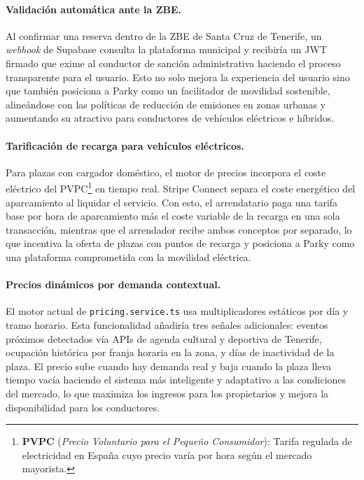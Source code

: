 \paragraph{Validación automática ante la ZBE.}
Al confirmar una reserva dentro de la ZBE de Santa Cruz de Tenerife, un \textit{webhook} de Supabase consulta la plataforma municipal y recibiría un JWT firmado que exime al conductor de sanción administrativa haciendo el proceso transparente para el usuario. Esto no solo mejora la experiencia del usuario sino que también posiciona a Parky como un facilitador de movilidad sostenible, alineándose con las políticas de reducción de emisiones en zonas urbanas y aumentando su atractivo para conductores de vehículos eléctricos e híbridos.

\paragraph{Tarificación de recarga para vehículos eléctricos.}
Para plazas con cargador doméstico, el motor de precios incorpora el coste eléctrico del PVPC\footnote{\textbf{PVPC} (\textit{Precio Voluntario para el Pequeño Consumidor}): Tarifa regulada de electricidad en España cuyo precio varía por hora según el mercado mayorista.} en tiempo real. Stripe Connect separa el coste energético del aparcamiento al liquidar el servicio. Con esto, el arrendatario paga una tarifa base por hora de aparcamiento más el coste variable de la recarga en una sola transacción, mientras que el arrendador recibe ambos conceptos por separado, lo que incentiva la oferta de plazas con puntos de recarga y posiciona a Parky como una plataforma comprometida con la movilidad eléctrica.

\paragraph{Precios dinámicos por demanda contextual.}
El motor actual de \texttt{pricing.service.ts} usa multiplicadores estáticos por día y tramo horario. Esta funcionalidad añadiría tres señales adicionales: eventos próximos detectados vía APIs de agenda cultural y deportiva de Tenerife, ocupación histórica por franja horaria en la zona, y días de inactividad de la plaza. El precio sube cuando hay demanda real y baja cuando la plaza lleva tiempo vacía haciendo el sistema más inteligente y adaptativo a las condiciones del mercado, lo que maximiza los ingresos para los propietarios y mejora la disponibilidad para los conductores.

